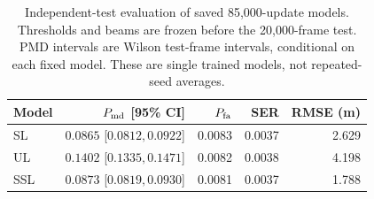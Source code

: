 \begin{table}[t]\centering\small
\caption{Independent-test evaluation of saved 85,000-update models. Thresholds and beams are frozen before the 20,000-frame test. PMD intervals are Wilson test-frame intervals, conditional on each fixed model. These are single trained models, not repeated-seed averages.}\label{tab:independent-main}
\setlength{\tabcolsep}{3pt}
\begin{tabular}{lrrrr}\toprule Model & $P_{\rm md}$ [95\% CI] & $P_{\rm fa}$ & SER & RMSE (m)\\\midrule
SL & $0.0865$ [$ 0.0812, 0.0922 $] & 0.0083 & 0.0037 & 2.629 \\
UL & $0.1402$ [$ 0.1335, 0.1471 $] & 0.0082 & 0.0038 & 4.198 \\
SSL & $0.0873$ [$ 0.0819, 0.0930 $] & 0.0081 & 0.0037 & 1.788 \\
\bottomrule\end{tabular}
\end{table}